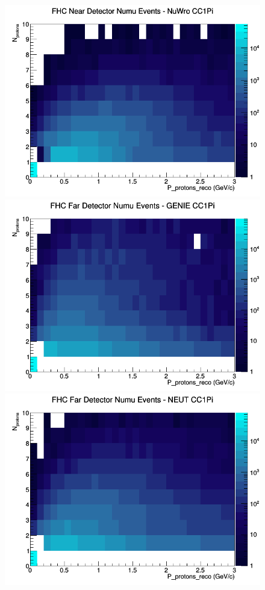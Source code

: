 \begin{figure}[h]
\includegraphics[width=\linewidth]{eff_N_P/FGT/protons/CC1Pi_FHC_ND_numu_N_P_NuWro.png}
\endminipage
\newline
{}
\includegraphics[width=\linewidth]{eff_N_P/FGT/protons/CC1Pi_FHC_FD_numu_N_P_GENIE.png}
\endminipage
{}
\includegraphics[width=\linewidth]{eff_N_P/FGT/protons/CC1Pi_FHC_FD_numu_N_P_NEUT.png}

\end{figure}
